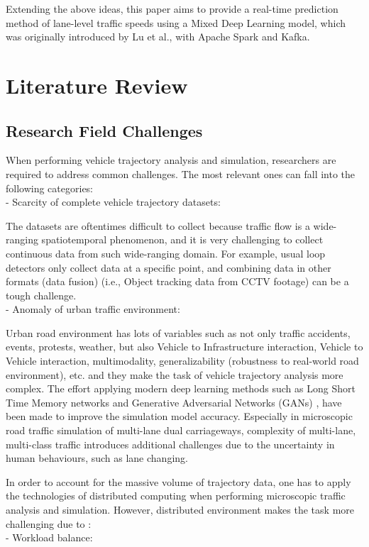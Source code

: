 \documentclass[11pt]{uonthesis}
\begin{document}
Extending the above ideas, this paper aims to provide a real-time prediction method of lane-level traffic speeds using a Mixed Deep Learning model, which was originally introduced by Lu et al.\cite{9284587}, with Apache Spark and Kafka. 

\chapter{Literature Review}
\section{Research Field Challenges}
When performing vehicle trajectory analysis and simulation, researchers are required to address common challenges. The most relevant ones can fall into the following categories:
\\
\noindent- Scarcity of complete vehicle trajectory datasets:

The datasets are oftentimes difficult to collect because traffic flow is a wide-ranging spatiotemporal phenomenon, and it is very challenging to collect continuous data from such wide-ranging domain\cite{seo2020evaluation}. For example, usual loop detectors only collect data at a specific point, and combining data in other formats (data fusion) (i.e., Object tracking data from CCTV footage) can be a tough challenge.
\\
\noident- Anomaly of urban traffic environment:

Urban road environment has lots of variables such as not only traffic accidents, events, protests, weather, but also Vehicle to Infrastructure interaction, Vehicle to Vehicle interaction, multimodality, generalizability (robustness to real-world road environment), etc. and they make the task of vehicle trajectory analysis more complex. The effort applying modern deep learning methods such as Long Short Time Memory networks and Generative Adversarial Networks (GANs) \cite{rossi2021vehicle}, have been made to improve the simulation model accuracy. Especially in microscopic road traffic simulation of multi-lane dual carriageways, complexity of multi-lane, multi-class traffic introduces additional challenges due to the uncertainty in human behaviours, such as lane changing\cite{DAHIYA2022100066}.

In order to account for the massive volume of trajectory data, one has to apply the technologies of distributed computing when performing microscopic traffic analysis and simulation. However, distributed environment makes the task more challenging due to \cite{yu2020dissecting}:
\\
\noindent- Workload balance:
\end{document}
